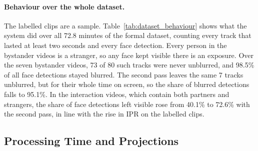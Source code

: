 \paragraph{Behaviour over the whole dataset.}
The labelled clips are a sample. Table~\ref{tab:dataset_behaviour} shows what the system
did over all 72.8 minutes of the formal dataset, counting every track that lasted at least
two seconds and every face detection. Every person in the bystander videos is a stranger,
so any face kept visible there is an exposure. Over the seven bystander videos, 73 of 80
such tracks were never unblurred, and 98.5\% of all face detections stayed blurred. The
second pass leaves the same 7 tracks unblurred, but for their whole time on screen, so the
share of blurred detections falls to 95.1\%. In the interaction videos, which contain both
partners and strangers, the share of face detections left visible rose from 40.1\% to
72.6\% with the second pass, in line with the rise in IPR on the labelled clips.

\begin{table}[htbp]
\begin{singlespace}
\centering
\caption{System behaviour over the whole formal dataset (tracks of at least 2~s and all
face detections).}
\label{tab:dataset_behaviour}
\renewcommand{\arraystretch}{1.3}
\end{singlespace}
\end{table}

\subsection{Processing Time and Projections}
\label{sec:res_speed}

